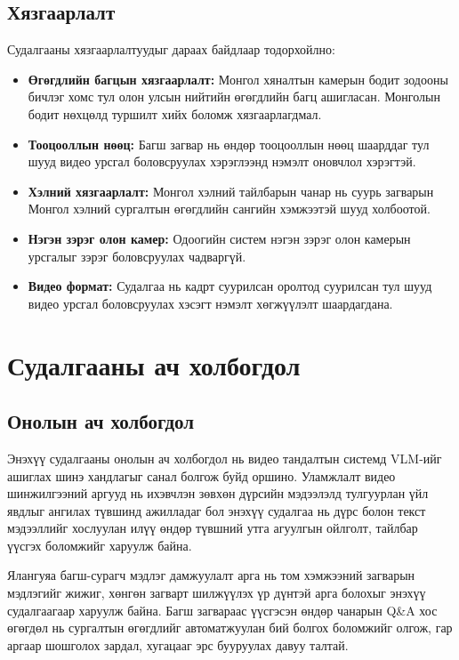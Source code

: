 \subsection*{Хязгаарлалт}

Судалгааны хязгаарлалтуудыг дараах байдлаар тодорхойлно:

\begin{itemize}
    \item \textbf{Өгөгдлийн багцын хязгаарлалт:} Монгол хяналтын камерын бодит зодооны бичлэг хомс тул олон улсын нийтийн өгөгдлийн багц ашигласан. Монголын бодит нөхцөлд туршилт хийх боломж хязгаарлагдмал.
    \item \textbf{Тооцооллын нөөц:} Багш загвар нь өндөр тооцооллын нөөц шаарддаг тул шууд видео урсгал боловсруулах хэрэглээнд нэмэлт оновчлол хэрэгтэй.
    \item \textbf{Хэлний хязгаарлалт:} Монгол хэлний тайлбарын чанар нь суурь загварын Монгол хэлний сургалтын өгөгдлийн сангийн хэмжээтэй шууд холбоотой.
    \item \textbf{Нэгэн зэрэг олон камер:} Одоогийн систем нэгэн зэрэг олон камерын урсгалыг зэрэг боловсруулах чадваргүй.
    \item \textbf{Видео формат:} Судалгаа нь кадрт суурилсан оролтод суурилсан тул шууд видео урсгал боловсруулах хэсэгт нэмэлт хөгжүүлэлт шаардагдана.
\end{itemize}

\section{Судалгааны ач холбогдол}

\subsection*{Онолын ач холбогдол}

Энэхүү судалгааны онолын ач холбогдол нь видео тандалтын системд VLM-ийг ашиглах шинэ хандлагыг санал болгож буйд оршино. Уламжлалт видео шинжилгээний аргууд нь ихэвчлэн зөвхөн дүрсийн мэдээлэлд тулгуурлан үйл явдлыг ангилах түвшинд ажилладаг бол энэхүү судалгаа нь дүрс болон текст мэдээллийг хослуулан илүү өндөр түвшний утга агуулгын ойлголт, тайлбар үүсгэх боломжийг харуулж байна.

Ялангуяа багш-сурагч мэдлэг дамжуулалт арга нь том хэмжээний загварын мэдлэгийг жижиг, хөнгөн загварт шилжүүлэх үр дүнтэй арга болохыг энэхүү судалгаагаар харуулж байна. Багш загвараас үүсгэсэн өндөр чанарын Q\&A хос өгөгдөл нь сургалтын өгөгдлийг автоматжуулан бий болгох боломжийг олгож, гар аргаар шошголох зардал, хугацааг эрс бууруулах давуу талтай.

